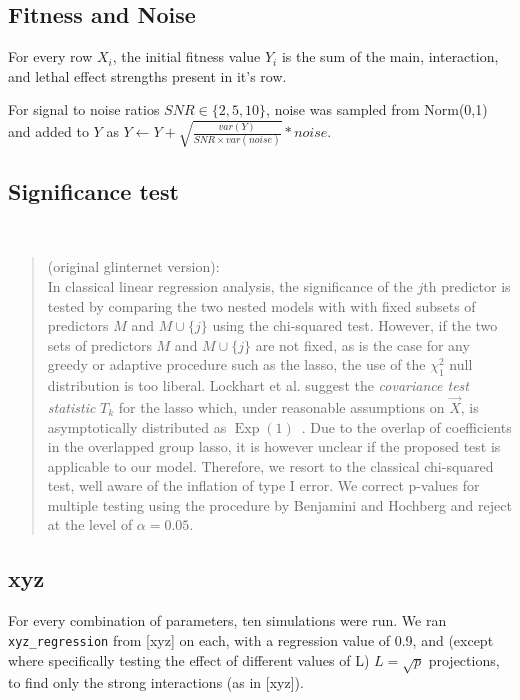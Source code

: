 \documentclass{amsart}
\begin{document}
\subsection{Fitness and Noise}
For every row $X_i$, the initial fitness value $Y_i$ is the sum of the main, interaction, and lethal effect strengths present in it's row.

For signal to noise ratios $SNR \in \{2,5,10\}$, noise was sampled from Norm(0,1) and added to $Y$ as $Y \leftarrow Y + \sqrt{\frac{var(Y)}{SNR \times var(noise)}} * noise$.

\subsection{Significance test}
~\\

\begin{quotation}
	(original glinternet version):\\
	In classical linear regression analysis, the significance of the $j$th predictor is tested by comparing the two nested models with with fixed subsets of predictors $M$ and $M \cup \{j\}$ using the chi-squared test. However, if the two sets of predictors $M$ and $M \cup \{j\}$ are not fixed, as is the case for any greedy or adaptive procedure such as the lasso, the use of the $\chi^2_1$ null distribution is too liberal. Lockhart et al. suggest the \emph{covariance test statistic} $T_k$ for the lasso which, under reasonable assumptions on $\vec{X}$, is asymptotically distributed as $\operatorname{Exp}(1)$~\cite{Lockhart:2013hm}. Due to the overlap of coefficients in the overlapped group lasso, it is however unclear if the proposed test is applicable to our model. Therefore, we resort to the classical chi-squared test, well aware of the inflation of type I error. We correct p-values for multiple testing using the procedure by Benjamini and Hochberg and reject at the level of $\alpha = 0.05$.
\end{quotation}

\subsection{xyz}
For every combination of parameters, ten simulations were run.
We ran \verb|xyz_regression| from [xyz] on each, with a regression value of 0.9, and (except where specifically testing the effect of different values of L) $L = \sqrt{p}$ projections, to find only the strong interactions (as in [xyz]).
\end{document}
